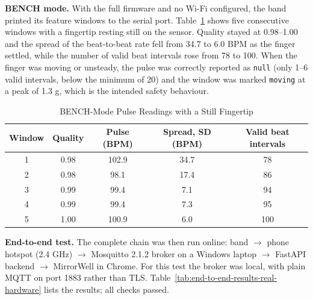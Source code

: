 \documentclass[12pt,letterpaper,oneside]{report}
\begin{document}
\textbf{BENCH mode.} With the full firmware and no Wi-Fi configured, the band printed its feature windows to the serial port. Table~\ref{tab:bench-mode-pulse-readings} shows five consecutive windows with a fingertip resting still on the sensor. Quality stayed at 0.98–1.00 and the spread of the beat-to-beat rate fell from 34.7 to 6.0 BPM as the finger settled, while the number of valid beat intervals rose from 78 to 100. When the finger was moving or unsteady, the pulse was correctly reported as \texttt{null} (only 1–6 valid intervals, below the minimum of 20) and the window was marked \texttt{moving} at a peak of 1.3 g, which is the intended safety behaviour.

\begin{table}[H]
\centering\small{}
\caption{BENCH-Mode Pulse Readings with a Still Fingertip}\label{tab:bench-mode-pulse-readings}
\begin{tabular}{|c|c|c|c|c|}
\hline
\rowcolor{headgray}\textbf{Window} & \textbf{Quality} & \textbf{Pulse (BPM)} & \textbf{Spread, SD (BPM)} & \textbf{Valid beat intervals} \\ \hline
1 & 0.98 & 102.9 & 34.7 & 78 \\ \hline
2 & 0.98 & 98.1 & 17.4 & 86 \\ \hline
3 & 0.99 & 99.4 & 7.1 & 94 \\ \hline
4 & 0.99 & 99.4 & 7.3 & 95 \\ \hline
5 & 1.00 & 100.9 & 6.0 & 100 \\ \hline
\end{tabular}
\end{table}

\textbf{End-to-end test.} The complete chain was then run online: band $\rightarrow$ phone hotspot (2.4 GHz) $\rightarrow$ Mosquitto 2.1.2 broker on a Windows laptop $\rightarrow$ FastAPI backend $\rightarrow$ MirrorWell in Chrome. For this test the broker was local, with plain MQTT on port 1883 rather than TLS. Table~\ref{tab:end-to-end-results-real-hardware} lists the results; all checks passed.
\end{document}
